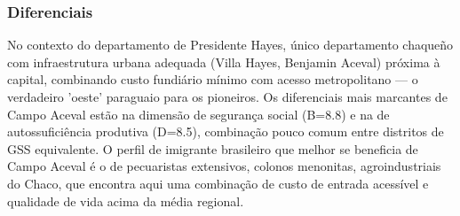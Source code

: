 \subsubsection*{Diferenciais}\label{dif-campo-aceval-1510}
No contexto do departamento de Presidente Hayes, único departamento chaqueño com infraestrutura urbana adequada (Villa Hayes, Benjamin Aceval) próxima à capital, combinando custo fundiário mínimo com acesso metropolitano — o verdadeiro 'oeste' paraguaio para os pioneiros. Os diferenciais mais marcantes de Campo Aceval estão na dimensão de segurança social (B=8.8) e na de autossuficiência produtiva (D=8.5), combinação pouco comum entre distritos de GSS equivalente. O perfil de imigrante brasileiro que melhor se beneficia de Campo Aceval é o de pecuaristas extensivos, colonos menonitas, agroindustriais do Chaco, que encontra aqui uma combinação de custo de entrada acessível e qualidade de vida acima da média regional.

